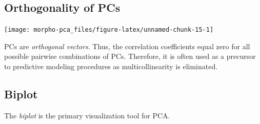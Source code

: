 \documentclass[]{article}
\newenvironment{Shaded}{\begin{snugshade}}{\end{snugshade}}
\newcommand{\CommentTok}[1]{\textcolor[rgb]{0.56,0.35,0.01}{\textit{#1}}}
\newcommand{\DataTypeTok}[1]{\textcolor[rgb]{0.13,0.29,0.53}{#1}}
\newcommand{\DecValTok}[1]{\textcolor[rgb]{0.00,0.00,0.81}{#1}}
\newcommand{\KeywordTok}[1]{\textcolor[rgb]{0.13,0.29,0.53}{\textbf{#1}}}
\newcommand{\NormalTok}[1]{#1}
\newcommand{\OperatorTok}[1]{\textcolor[rgb]{0.81,0.36,0.00}{\textbf{#1}}}
\newcommand{\OtherTok}[1]{\textcolor[rgb]{0.56,0.35,0.01}{#1}}
\newcommand{\StringTok}[1]{\textcolor[rgb]{0.31,0.60,0.02}{#1}}
\begin{document}
\hypertarget{orthogonality-of-pcs}{%
\subsection{Orthogonality of PCs}\label{orthogonality-of-pcs}}

\begin{Shaded}
\end{Shaded}

\begin{center}\texttt{[image: morpho-pca\_files/figure-latex/unnamed-chunk-15-1]} \end{center}

PCs are \emph{orthogonal vectors}. Thus, the correlation coefficients
equal zero for all possible pairwise combinations of PCs. Therefore, it
is often used as a precursor to predictive modeling procedures as
multicollinearity is eliminated.

\hypertarget{biplot}{%
\subsection{Biplot}\label{biplot}}

The \emph{biplot} is the primary visualization tool for PCA.
\end{document}
